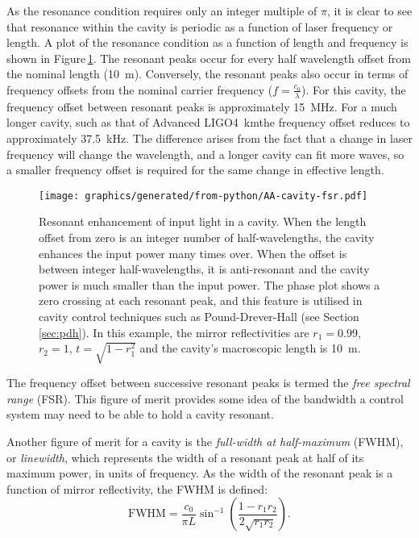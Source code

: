 As the resonance condition requires only an integer multiple of $\pi$, it is clear to see that resonance within the cavity is periodic as a function of laser frequency or length. A plot of the resonance condition as a function of length and frequency is shown in Figure\,\ref{fig:cavity-fsr}. The resonant peaks occur for every half wavelength offset from the nominal length (\SI{10}{\meter}). Conversely, the resonant peaks also occur in terms of frequency offsets from the nominal carrier frequency ($f = \frac{c_0}{\lambda}$). For this cavity, the frequency offset between resonant peaks is approximately \SI{15}{\mega\hertz}. For a much longer cavity, such as that of Advanced LIGO\textemdash \SI{4}{\kilo\meter}\textemdash the frequency offset reduces to approximately \SI{37.5}{\kilo\hertz}. The difference arises from the fact that a change in laser frequency will change the wavelength, and a longer cavity can fit more waves, so a smaller frequency offset is required for the same change in effective length.

\begin{figure}
  \centering
  \texttt{[image: graphics/generated/from-python/AA-cavity-fsr.pdf]}
  \caption{\label{fig:cavity-fsr}Resonant enhancement of input light in a cavity. When the length offset from zero is an integer number of half-wavelengths, the cavity enhances the input power many times over. When the offset is between integer half-wavelengths, it is anti-resonant and the cavity power is much smaller than the input power. The phase plot shows a zero crossing at each resonant peak, and this feature is utilised in cavity control techniques such as Pound-Drever-Hall (see Section\,\ref{sec:pdh}). In this example, the mirror reflectivities are $r_1 = 0.99$, $r_2 = 1$, $t = \sqrt{1 - r_1^2}$ and the cavity's macroscopic length is \SI{10}{\meter}.}
\end{figure}

The frequency offset between successive resonant peaks is termed the \emph{free spectral range} (\gls{FSR}). This figure of merit provides some idea of the bandwidth a control system may need to be able to hold a cavity resonant.

Another figure of merit for a \FP{} cavity is the \emph{full-width at half-maximum} (\gls{FWHM}), or \emph{linewidth}, which represents the width of a resonant peak at half of its maximum power, in units of frequency. As the width of the resonant peak is a function of mirror reflectivity, the \gls{FWHM} is defined:
\begin{equation}
  \text{FWHM} = \frac{c_0}{\pi L} \sin^{-1}{\left( \frac{1 - r_1 r_2}{2 \sqrt{r_1 r_2}} \right)}.
\end{equation}

